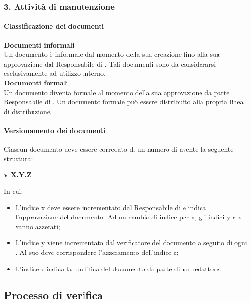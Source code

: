 \subsubsection{3. Attivit\`a di manutenzione}   %
\paragraph*{Classificazione dei documenti}
\textbf{Documenti informali} \\
Un documento è informale dal momento della sua creazione fino alla sua approvazione dal Responsabile di . Tali documenti sono da considerarsi esclusivamente ad utilizzo interno. \\
\textbf{Documenti formali}  \\
Un documento diventa formale al momento della sua approvazione da parte Responsabile di . Un documento formale pu\`o essere distribuito alla propria linea di distribuzione.

\paragraph*{Versionamento dei documenti}
Ciascun documento deve essere corredato di un numero di  avente la seguente struttura:

\begin{center}
  \textbf{v X.Y.Z}
\end{center}

In cui:
\begin{itemize}
\item L'indice x deve essere incrementato dal Responsabile di  e indica l'approvazione del documento. Ad un cambio di indice per x, gli indici y e z vanno azzerati;
\item L'indice y viene incrementato dal verificatore del documento a seguito di ogni . Al suo  deve corrispondere l'azzeramento dell'indice z;
\item L'indice z indica la modifica del documento da parte di un redattore.
\end{itemize}






\subsection{Processo di verifica}
